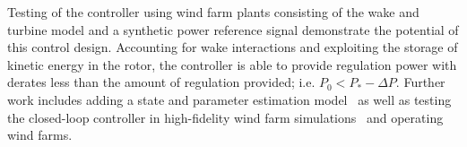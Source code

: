 Testing of the controller using wind farm plants consisting of the wake and turbine model and a synthetic power reference signal demonstrate the potential of this control design. Accounting for wake interactions and exploiting the storage of kinetic energy in the rotor, the controller is able to provide regulation power with derates less than the amount of regulation provided; i.e. $P_0 < P_* - \Delta P$. Further work includes adding a state and parameter estimation model~\cite{Shapiro2017b} as well as testing the closed-loop controller in high-fidelity wind farm simulations~\cite{Shapiro2018a} and operating wind farms. 